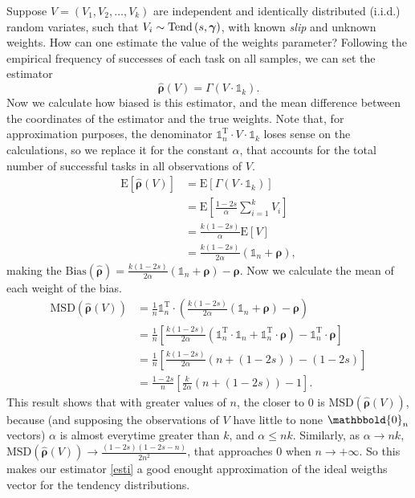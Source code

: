\documentclass{article}
\newcommand{\0}{\mathbbold{0}}
\newcommand{\1}{\mathds{1}}
\newcommand{\2}{\mathbbold{2}}
\newcommand{\T}{^{\operatorname{T}}}
\newcommand{\Tend}[2]{\textup{Tend}\left(#1,#2\right)}
\begin{document}
Suppose $V = \left(V_1, V_2, \dots, V_k\right)$ are independent and identically distributed (i.i.d.) random variates, such that $V_i \sim \Tend{s}{\boldsymbol \gamma}$, with known \textsl{slip} and unknown weights. How can one estimate the value of the weights parameter?
Following the empirical frequency of successes of each task on all samples, we can set the estimator
\begin{equation}
    \widehat{\boldsymbol \rho}(V) = \varGamma(V\cdot\1_k). \label{esti}
\end{equation}
Now we calculate how biased is this estimator, and the mean difference between the coordinates of the estimator and the true weights. Note that, for approximation purposes, the denominator $\1_n\T \cdot V \cdot \1_k$ loses sense on the calculations, so we replace it for the constant $\alpha$, that accounts for the total number of successful tasks in all observations of $V$.
\begin{align*}
    \text{E}\left[\widehat{\boldsymbol \rho}(V)\right] &= \text{E}\left[\varGamma(V\cdot\1_k)\right] \\
    &= \text{E}\left[\frac{1-2s}{\alpha}\sum_{i=1}^{k}V_i\right] \\
    &= \frac{k(1-2s)}{\alpha}\text{E}\left[V\right] \\
    &= \frac{k(1-2s)}{2\alpha}(\1_n + {\boldsymbol \rho}),
\end{align*}
making the $\text{Bias}(\widehat{\boldsymbol \rho}) = \frac{k(1-2s)}{2\alpha}(\1_n + {\boldsymbol \rho}) - {\boldsymbol \rho}$. Now we calculate the mean of each weight of the bias.
\begin{align*}
    \text{MSD}\left(\widehat{\boldsymbol \rho}(V)\right) &= \frac{1}{n}\1_n\T\cdot\left(\frac{k(1-2s)}{2\alpha}(\1_n + {\boldsymbol \rho}) - {\boldsymbol \rho}\right) \\
    &= \frac{1}{n}\left[\frac{k(1-2s)}{2\alpha}\left(\1_n\T\cdot\1_n + \1_n\T\cdot{\boldsymbol \rho}\right) - \1_n\T\cdot{\boldsymbol \rho}\right]  \\
    &= \frac{1}{n}\left[\frac{k(1-2s)}{2\alpha}\left(n + (1-2s)\right) - (1-2s)\right] \\
    &= \frac{1-2s}{n}\left[\frac{k}{2\alpha}\left(n + (1-2s)\right) - 1\right].
\end{align*}
This result shows that with greater values of $n$, the closer to $0$ is $\text{MSD}\left(\widehat{\boldsymbol \rho}(V)\right)$, because (and supposing the observations of $V$ have little to none $\0_n$ vectors) $\alpha$ is almost everytime greater than $k$, and $\alpha \le nk$.
Similarly, as $\alpha \to nk$, $\text{MSD}\left(\widehat{\boldsymbol \rho}(V)\right) \to \frac{(1-2s)(1-2s-n)}{2n^2}$, that approaches $0$ when $n \to +\infty$.
So this makes our estimator \eqref{esti} a good enought approximation of the ideal weigths vector for the tendency distributions.
\end{document}
